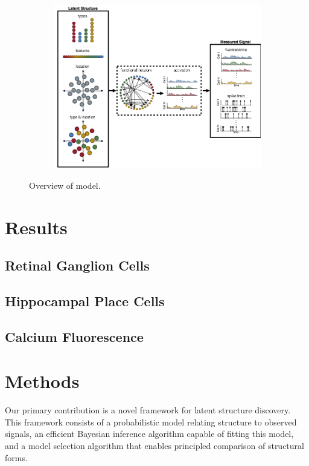 \begin{figure}[t]
  \centering
  \begin{subfigure}[b]{\textwidth}
    \centering
    \includegraphics[width=\textwidth]{figures/ch3/figure1.png}
  \end{subfigure}
  \caption{Overview of model.}
  \label{fig:fig1}
\end{figure}

\section{Results}

\subsection{Retinal Ganglion Cells}

\subsection{Hippocampal Place Cells}

\subsection{Calcium Fluorescence}

\section{Methods}
Our primary contribution is a novel framework for latent structure discovery.
This framework consists of a probabilistic model relating structure to observed signals, an efficient Bayesian inference algorithm capable of fitting this model, and a model selection algorithm that enables principled comparison of structural forms.

